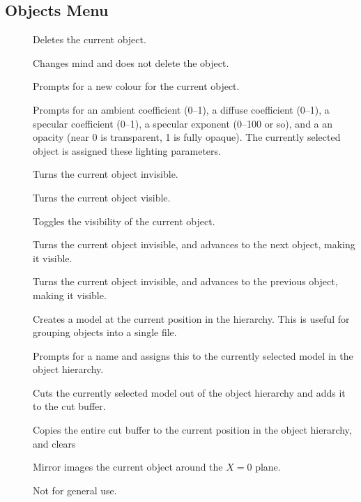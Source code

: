 \subsection{Objects Menu}

\begin{description}
\item[]  Deletes the current
        object.
\item[]  Changes mind and
        does not delete the object.
\item[]  Prompts for a new colour for the
        current object.
\item[]  Prompts for an ambient
        coefficient (0--1), a diffuse coefficient (0--1), a
        specular coefficient (0--1), a specular exponent (0--100 or so),
        and a an opacity (near 0 is transparent, 1 is fully opaque).
        The currently selected object is assigned these lighting parameters.
\item[]  Turns the current object invisible.
\item[]  Turns the current object visible.
\item[]  Toggles the visibility of
        the current object.
\item[]  Turns the current object invisible,
               and advances to the next object, making it visible.
\item[]  Turns the current object invisible,
               and advances to the previous object, making it visible.
\item[]  Creates a model at the current
               position in the hierarchy.  This is useful for grouping
               objects into a single file.
\item[]  Prompts for a name and
               assigns this to the currently selected model in the object
               hierarchy.
\item[]  Cuts the currently selected model
               out of the object hierarchy and adds it to the cut buffer.
\item[]  Copies the entire cut buffer to
               the current position in the object hierarchy, and clears
\item[]  Mirror images the current object
               around the $X = 0$ plane.
\item[]  Not for general use.
\end{description}

